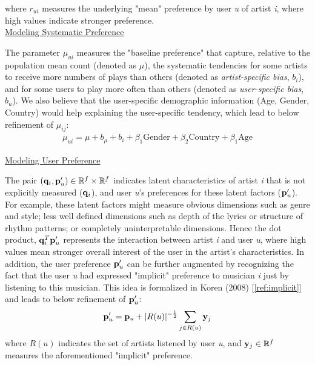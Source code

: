 \documentclass[11pt]{article}
\theoremstyle{definition}
\begin{document}
where $r_{ui}$ measures the underlying "mean" preference by user \textit{u} of artist \textit{i}, where high values indicate stronger preference. \\

\underline{Modeling Systematic Preference}

The parameter $\mu_{ui}$ measures the "baseline preference" that capture, relative to the population mean count (denoted as $\mu$), the systematic tendencies for some artists to receive more numbers of plays than others (denoted as \textit{artist-specific bias}, $b_i$), and for some users to play more often than others (denoted as \textit{user-specific bias}, $b_u$). We also believe that the user-specific demographic information (Age, Gender, Country) would help explaining the user-specific tendency, which lead to below refinement of $\mu_{ij}$:
\begin{align}\label{eq:bias model}
\mu_{ui} = \mu + b_\mu + b_i + \beta_1\mbox{Gender} + \beta_2\mbox{Country} +  \beta_1\mbox{Age} 
\end{align}

\underline{Modeling User Preference}

The pair $({\bf q}_i, {\bf p}'_u) \in \mathbb{R}^f \times \mathbb{R}^f$  indicates latent characteristics of artist \textit{i} that is not explicitly measured (${\bf q}_i$), and user \textit{u}'s preferences for these latent factors (${\bf p}'_u$). For example, these latent factors might measure obvious dimensions such as genre and style; less well defined dimensions such as depth of the lyrics or structure of rhythm patterns; or completely uninterpretable dimensions. Hence the dot product, ${\bf q}_i^T {\bf p}'_u$ represents the interaction between artist \textit{i} and user \textit{u}, where high values mean stronger overall interest of the user in the artist's characteristics. In addition, the user preference ${\bf p}'_u$ can be further augmented by recognizing the fact that the user \textit{u} had expressed "implicit" preference to musician \textit{i} just by listening to this musician. This idea is formalized in Koren (2008) [\ref{ref:implicit}] and leads to below refinement of ${\bf p}'_u$:
\begin{align}\label{eq:preference model}
{\bf p}'_u = {\bf p}_{u}+|R(u)|^{-\frac{1}{2}} \sum_{j \in R(u)} {\bf y}_j
\end{align}
where $R(u)$ indicates the set of artists listened by user \textit{u}, and ${\bf y}_j \in \mathbb{R}^f$ measures the aforementioned "implicit" preference. \\
\end{document}
